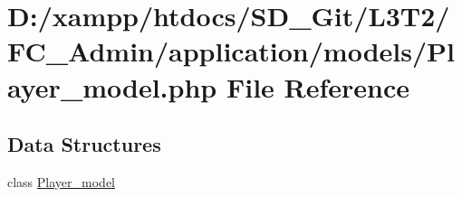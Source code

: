 \hypertarget{_admin_2application_2models_2_player__model_8php}{}\section{D\+:/xampp/htdocs/\+S\+D\+\_\+\+Git/\+L3\+T2/\+F\+C\+\_\+\+Admin/application/models/\+Player\+\_\+model.php File Reference}
\label{_admin_2application_2models_2_player__model_8php}
\subsection*{Data Structures}
\begin{DoxyCompactItemize}
\item 
class \hyperlink{class_player__model}{Player\+\_\+model}
\end{DoxyCompactItemize}
